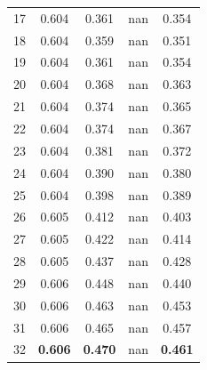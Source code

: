 \documentclass[11pt,a4paper]{article}
\begin{document}
\begin{table}[H]
\begin{tabular}{rcccc}
17 & 0.604 & 0.361 & nan & 0.354 \\

18 & 0.604 & 0.359 & nan & 0.351 \\

19 & 0.604 & 0.361 & nan & 0.354 \\

20 & 0.604 & 0.368 & nan & 0.363 \\

21 & 0.604 & 0.374 & nan & 0.365 \\

22 & 0.604 & 0.374 & nan & 0.367 \\

23 & 0.604 & 0.381 & nan & 0.372 \\

24 & 0.604 & 0.390 & nan & 0.380 \\

25 & 0.604 & 0.398 & nan & 0.389 \\

26 & 0.605 & 0.412 & nan & 0.403 \\

27 & 0.605 & 0.422 & nan & 0.414 \\

28 & 0.605 & 0.437 & nan & 0.428 \\

29 & 0.606 & 0.448 & nan & 0.440 \\

30 & 0.606 & 0.463 & nan & 0.453 \\

31 & 0.606 & 0.465 & nan & 0.457 \\

32 & \textbf{0.606} & \textbf{0.470} & nan & \textbf{0.461} \\

\bottomrule

\end{tabular}

\end{table}
\end{document}

